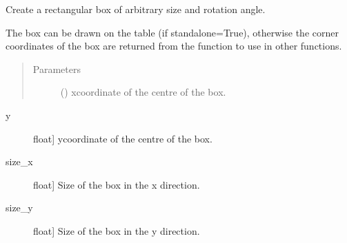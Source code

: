 \documentclass[letterpaper,10pt,english]{sphinxmanual}
\begin{document}
\begin{fulllineitems}
\begin{fulllineitems}
\begin{quote}
\begin{description}
\end{description}\end{quote}

\end{fulllineitems}


\begin{fulllineitems}
\label{\detokenize{index:pyopticaltable.OpticalTable.box}}
\sphinxAtStartPar
Create a rectangular box of arbitrary size and rotation angle.

\sphinxAtStartPar
The box can be drawn on the table (if standalone=True), otherwise the
corner coordinates of the box are returned from the function to use in
other functions.
\begin{quote}\begin{description}
\item[{Parameters}] \leavevmode
\sphinxAtStartPar
{} () \textendash{} x\sphinxhyphen{}coordinate of the centre of the box.

\end{description}\end{quote}
\begin{description}
\item[{y}] \leavevmode{[}float{]}
\sphinxAtStartPar
y\sphinxhyphen{}coordinate of the centre of the box.

\item[{size\_x}] \leavevmode{[}float{]}
\sphinxAtStartPar
Size of the box in the x direction.

\item[{size\_y}] \leavevmode{[}float{]}
\sphinxAtStartPar
Size of the box in the y direction.


\end{description}
\end{fulllineitems}
\end{fulllineitems}
\end{document}
